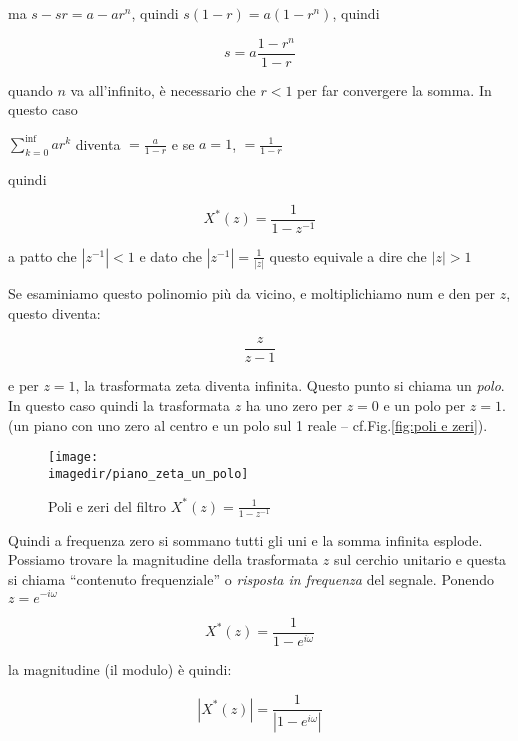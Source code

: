    ma $s - sr = a - ar^{n}$, quindi $s(1 - r) = a(1 - r^{n})$, quindi

		 \begin{equation}
				s = a \frac{1 - r^{n}}{1 - r}
		 \end{equation}

   quando $n$ va all'infinito, \`e necessario che $r < 1$ per far convergere la somma. In questo caso

	 $\sum_{k=0}^{\inf}{ar^{k}}$ diventa $=\frac{a}{1 - r}$ e se $a = 1$, $= \frac{1}{1 - r}$

   quindi 

		 \begin{equation}
			  X^{*}(z) = \frac{1}{1-z^{-1}}
		 \end{equation}

   a patto che $|z^{-1}| < 1$ e dato che $|z^{-1}| = \frac{1}{|z|}$ questo equivale a dire che $|z| > 1$

   Se esaminiamo questo polinomio pi\`u da vicino, e moltiplichiamo num e den
   per $z$, questo diventa:

		 \begin{equation}
						 \frac{z}{z - 1}
		 \end{equation}

   e per $z = 1$, la trasformata zeta diventa infinita. Questo punto si chiama
	 un \emph{polo}. In questo caso quindi la trasformata $z$ ha uno zero per $z = 0$ e
	 un polo per $z = 1$. (un piano con uno zero al centro e un polo sul 1 reale -- cf.Fig.\vref{fig:poli e zeri}).
	 \begin{figure}[Hbtp]
			\begin{center}
				\texttt{[image: \\imagedir/piano\_zeta\_un\_polo]}
				\caption{Poli e zeri del filtro $X^{*}(z) = \frac{1}{1-z^{-1}}$\label{fig:poli e zeri}}
			\end{center}
	 \end{figure}
   Quindi a frequenza zero si sommano tutti gli uni e la somma infinita
   esplode. Possiamo trovare la magnitudine della trasformata $z$ sul cerchio
   unitario e questa si chiama ``contenuto frequenziale'' o \emph{risposta in
	 frequenza} del segnale. Ponendo $z = e^{-i\omega}$

		 \begin{equation}
				X^{*}(z) = \frac{1}{1 - e^{i\omega}}
		 \end{equation}

   la magnitudine (il modulo) \`e quindi:

		 \begin{equation}
				|X^{*}(z)| = \frac{1}{|1 - e^{i\omega}|}
		 \end{equation}


